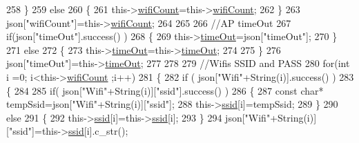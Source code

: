 \begin{DoxyCode}
258             \}
259             \textcolor{keywordflow}{else}
260             \{
261                 this->\hyperlink{classCoolWifi_ab133bd92fcb895b884deecd6678592e4}{wifiCount}=this->\hyperlink{classCoolWifi_ab133bd92fcb895b884deecd6678592e4}{wifiCount};
262             \}
263             json[\textcolor{stringliteral}{"wifiCount"}]=this->\hyperlink{classCoolWifi_ab133bd92fcb895b884deecd6678592e4}{wifiCount};
264 
265             
266             \textcolor{comment}{//AP timeOut}
267             \textcolor{keywordflow}{if}(json[\textcolor{stringliteral}{"timeOut"}].success() )
268             \{
269                 this->\hyperlink{classCoolWifi_a952111605f25156588b5632caaba1c6f}{timeOut}=json[\textcolor{stringliteral}{"timeOut"}];
270             \}
271             \textcolor{keywordflow}{else}
272             \{
273                 this->\hyperlink{classCoolWifi_a952111605f25156588b5632caaba1c6f}{timeOut}=this->\hyperlink{classCoolWifi_a952111605f25156588b5632caaba1c6f}{timeOut};
274 
275             \}
276             json[\textcolor{stringliteral}{"timeOut"}]=this->\hyperlink{classCoolWifi_a952111605f25156588b5632caaba1c6f}{timeOut};
277             
278             
279             \textcolor{comment}{//Wifis SSID and PASS}
280             \textcolor{keywordflow}{for}(\textcolor{keywordtype}{int} i =0; i<this->\hyperlink{classCoolWifi_ab133bd92fcb895b884deecd6678592e4}{wifiCount} ;i++)
281             \{
282                 \textcolor{keywordflow}{if} ( json[\textcolor{stringliteral}{"Wifi"}+String(i)].success() )
283                 \{
284                     
285                     \textcolor{keywordflow}{if}( json[\textcolor{stringliteral}{"Wifi"}+String(i)][\textcolor{stringliteral}{"ssid"}].success() )
286                     \{
287                         \textcolor{keyword}{const} \textcolor{keywordtype}{char}* tempSsid=json[\textcolor{stringliteral}{"Wifi"}+String(i)][\textcolor{stringliteral}{"ssid"}]; 
288                         this->\hyperlink{classCoolWifi_a893b21d0fed821438733bba2e73fb4c2}{ssid}[i]=tempSsid;                 
289                     \}
290                     \textcolor{keywordflow}{else}
291                     \{
292                         this->\hyperlink{classCoolWifi_a893b21d0fed821438733bba2e73fb4c2}{ssid}[i]=this->\hyperlink{classCoolWifi_a893b21d0fed821438733bba2e73fb4c2}{ssid}[i];                    
293                     \}
294                     json[\textcolor{stringliteral}{"Wifi"}+String(i)][\textcolor{stringliteral}{"ssid"}]=this->\hyperlink{classCoolWifi_a893b21d0fed821438733bba2e73fb4c2}{ssid}[i].c\_str();

\end{DoxyCode}
